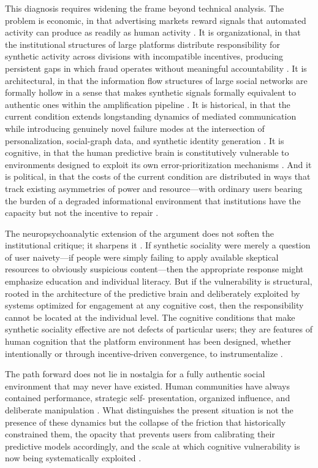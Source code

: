 \documentclass[12pt,a4paper]{article}
\begin{document}
This diagnosis requires widening the frame beyond technical analysis. The problem is economic,
in that advertising markets reward signals that automated activity can produce as readily as
human activity \citep{wu2016}. It is organizational, in that the institutional structures of
large platforms distribute responsibility for synthetic activity across divisions with incompatible
incentives, producing persistent gaps in which fraud operates without meaningful accountability
\citep{tufekci2015}. It is architectural, in that the information flow structures of large
social networks are formally hollow in a sense that makes synthetic signals formally equivalent
to authentic ones within the amplification pipeline \citep{gloy2025}. It is historical, in that
the current condition extends longstanding dynamics of mediated communication while introducing
genuinely novel failure modes at the intersection of personalization, social-graph data, and
synthetic identity generation \citep{debord1967,postman1985,vosoughi2018}. It is cognitive, in
that the human predictive brain is constitutively vulnerable to environments designed to exploit
its own error-prioritization mechanisms \citep{friston2010,panksepp1998}. And it is political,
in that the costs of the current condition are distributed in ways that track existing
asymmetries of power and resource---with ordinary users bearing the burden of a degraded
informational environment that institutions have the capacity but not the incentive to repair
\citep{noble2018,zuboff2019}.

The neuropsychoanalytic extension of the argument does not soften the institutional critique;
it sharpens it \citep{dallaglio2024}. If synthetic sociality were merely a question of user
naivety---if people were simply failing to apply available skeptical resources to obviously
suspicious content---then the appropriate response might emphasize education and individual
literacy. But if the vulnerability is structural, rooted in the architecture of the predictive
brain and deliberately exploited by systems optimized for engagement at any cognitive cost, then
the responsibility cannot be located at the individual level. The cognitive conditions that make
synthetic sociality effective are not defects of particular users; they are features of human
cognition that the platform environment has been designed, whether intentionally or through
incentive-driven convergence, to instrumentalize \citep{friston2010,zuboff2019}.

The path forward does not lie in nostalgia for a fully authentic social environment that may
never have existed. Human communities have always contained performance, strategic self-
presentation, organized influence, and deliberate manipulation \citep{debord1967}. What
distinguishes the present situation is not the presence of these dynamics but the collapse of
the friction that historically constrained them, the opacity that prevents users from calibrating
their predictive models accordingly, and the scale at which cognitive vulnerability is now being
systematically exploited \citep{vosoughi2018,dallaglio2024}.
\end{document}
